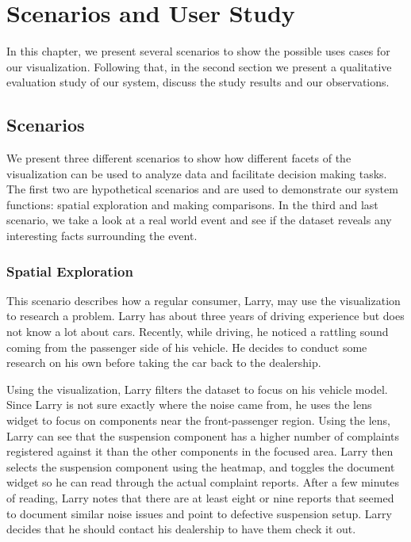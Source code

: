 
\chapter{Scenarios and User Study}
In this chapter, we present several scenarios to show the possible uses cases
for our visualization. Following that, in the second section we present a
qualitative evaluation study of our system, discuss the study results and our
observations.

\section{Scenarios}
We present three different scenarios to show how different facets of the
visualization can be used to analyze data and facilitate decision making tasks.
The first two are hypothetical scenarios and are used to demonstrate our system
functions: spatial exploration and making comparisons. In the third and last
scenario, we take a look at a real world event and see if the dataset reveals
any interesting facts surrounding the event.

 
\subsection{Spatial Exploration}
This scenario describes how a regular consumer, Larry, may use the 
visualization to research a problem. Larry has about three years of driving 
experience but does not know a lot about cars. Recently, while driving, he 
noticed a rattling sound coming from the passenger side of his vehicle. 
He decides to conduct some research on his own before taking the car back 
to the dealership.

Using the visualization, Larry filters the dataset to focus on his
vehicle model. Since Larry is not sure exactly where the noise came from, 
he uses the lens widget to focus on components near the front-passenger 
region. Using the lens, Larry can see that the suspension component has a
higher number of complaints registered against it than the other components 
in the focused area. Larry then selects the suspension component using 
the heatmap, and toggles the document widget so he can read through the 
actual complaint reports. After a few minutes of reading, Larry notes that
there are at least eight or nine reports that seemed to document similar noise 
issues and point to defective suspension setup. Larry decides that he 
should contact his dealership to have them check it out.

